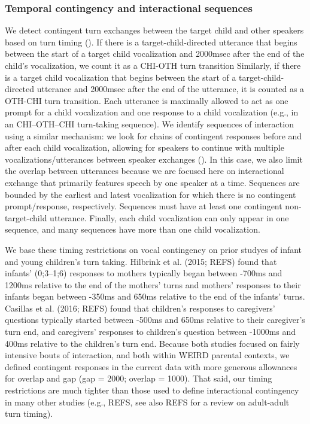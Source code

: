 \documentclass[floatsintext,man]{apa6}
\theoremstyle{definition}
\theoremstyle{definition}
\theoremstyle{definition}
\theoremstyle{remark}
\begin{document}
\subsubsection{Temporal contingency and interactional
sequences}\label{temporal-contingency-and-interactional-sequences}

We detect contingent turn exchanges between the target child and other
speakers based on turn timing (). If there is a target-child-directed
utterance that begins between the start of a target child vocalization
and 2000msec after the end of the child's vocalization, we count it as a
CHI-OTH turn transition Similarly, if there is a target child
vocalization that begins between the start of a target-child-directed
utterance and 2000msec after the end of the utterance, it is counted as
a OTH-CHI turn transition. Each utterance is maximally allowed to act as
one prompt for a child vocalization and one response to a child
vocalization (e.g., in an CHI--OTH--CHI turn-taking sequence). We
identify sequences of interaction using a similar mechanism: we look for
chains of contingent responses before and after each child vocalization,
allowing for speakers to continue with multiple vocalizations/utterances
between speaker exchanges (). In this case, we also limit the overlap
between utterances because we are focused here on interactional exchange
that primarily features speech by one speaker at a time. Sequences are
bounded by the earliest and latest vocalization for which there is no
contingent prompt/response, respectively. Sequences must have at least
one contingent non-target-child utterance. Finally, each child
vocalization can only appear in one sequence, and many sequences have
more than one child vocalization.

We base these timing restrictions on vocal contingency on prior studyes
of infant and young children's turn taking. Hilbrink et al. (2015; REFS)
found that infants' (0;3--1;6) responses to mothers typically began
between -700ms and 1200ms relative to the end of the mothers' turns and
mothers' responses to their infants began between -350ms and 650ms
relative to the end of the infants' turns. Casillas et al. (2016; REFS)
found that children's responses to caregivers' questions typically
started between -500ms and 650ms relative to their caregiver's turn end,
and caregivers' responses to children's question between -1000ms and
400ms relative to the children's turn end. Because both studies focused
on fairly intensive bouts of interaction, and both within WEIRD parental
contexts, we defined contingent responses in the current data with more
generous allowances for overlap and gap (gap = 2000; overlap = 1000).
That said, our timing restrictions are much tighter than those used to
define interactional contingency in many other studies (e.g., REFS, see
also REFS for a review on adult-adult turn timing).
\end{document}
